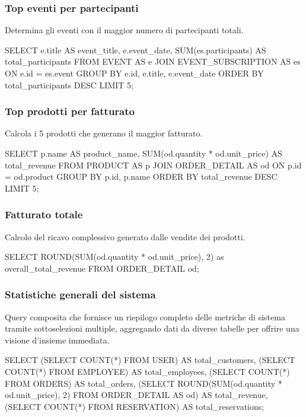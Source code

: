 \documentclass[a4paper,12pt]{report}
\begin{document}
\newpage
\subsubsection{Top eventi per partecipanti}
Determina gli eventi con il maggior numero di partecipanti totali.

\begin{sqlcode}[caption={}]
SELECT
  e.title AS event_title,
  e.event_date,
  SUM(es.participants) AS total_participants
FROM EVENT AS e
JOIN EVENT_SUBSCRIPTION AS es ON e.id = es.event
GROUP BY e.id, e.title, e.event_date
ORDER BY total_participants DESC
LIMIT 5;
\end{sqlcode}

\subsubsection{Top prodotti per fatturato}
Calcola i 5 prodotti che generano il maggior fatturato.

\begin{sqlcode}[caption={}]
SELECT
  p.name AS product_name,
  SUM(od.quantity * od.unit_price) AS total_revenue
FROM PRODUCT AS p
JOIN ORDER_DETAIL AS od ON p.id = od.product
GROUP BY p.id, p.name
ORDER BY total_revenue DESC
LIMIT 5;
\end{sqlcode}

\subsubsection{Fatturato totale}
Calcolo del ricavo complessivo generato dalle vendite dei prodotti.

\begin{sqlcode}[caption={}]
SELECT ROUND(SUM(od.quantity * od.unit_price), 2) as overall_total_revenue
FROM ORDER_DETAIL od;
\end{sqlcode}

\subsubsection{Statistiche generali del sistema}
Query composita che fornisce un riepilogo completo delle metriche di
sistema tramite sottoselezioni multiple, aggregando dati da diverse
tabelle per offrire una visione d'insieme immediata.

\begin{sqlcode}[caption={}]
SELECT
  (SELECT COUNT(*) FROM USER) AS total_customers,
  (SELECT COUNT(*) FROM EMPLOYEE) AS total_employees,
  (SELECT COUNT(*) FROM ORDERS) AS total_orders,
  (SELECT ROUND(SUM(od.quantity * od.unit_price), 2) FROM ORDER_DETAIL AS od) AS total_revenue,
  (SELECT COUNT(*) FROM RESERVATION) AS total_reservations;
\end{sqlcode}
\end{document}
